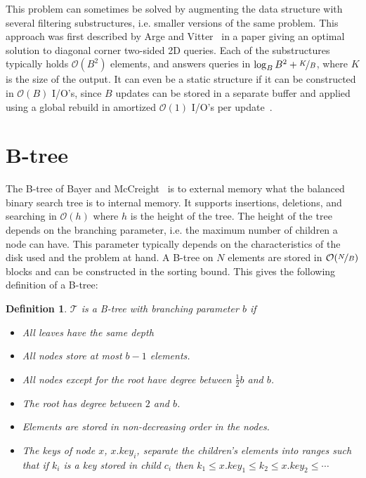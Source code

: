 \documentclass[twoside,11pt,openright]{report}
\newtheorem{definition}{Definition}
\begin{document}
This problem can sometimes be solved by augmenting the data structure with several filtering substructures, i.e. smaller versions of the same problem. This approach was first described by Arge and Vitter~\cite{arge_vitter_2003} in a paper giving an optimal solution to diagonal corner two-sided 2D queries. Each of the substructures typically holds $\mathcal{O}(B^2)$ elements, and answers queries in $\log_B B^2 + \nicefrac{K}{B}$, where $K$ is the size of the output. It can even be a static structure if it can be constructed in $\mathcal{O}(B)$ I/O's, since $B$ updates can be stored in a separate buffer and applied using a global rebuild in amortized $\mathcal{O}(1)$ I/O's per update~\cite{vitter_2008}.

\section{B-tree}
\label{sec:prelim_b_tree}
The B-tree of Bayer and McCreight~\cite{bayer_mccreight_1972} is to external memory what the balanced binary search tree is to internal memory. It supports insertions, deletions, and searching in $\mathcal{O}(h)$ where $h$ is the height of the tree. The height of the tree depends on the branching parameter, i.e. the maximum number of children a node can have. This parameter typically depends on the characteristics of the disk used and the problem at hand. A B-tree on $N$ elements are stored in $\mathcal{O}(\nicefrac{N}{B})$ blocks and can be constructed in the sorting bound.
This gives the following definition of a B-tree:

\begin{definition}
\label{def:btree}
$\mathcal{T}$ is a B-tree with branching parameter $b$ if
\begin{itemize}
	\item All leaves have the same depth
	\item All nodes store at most $b-1$ elements.
	\item All nodes except for the root have degree between $\frac{1}{2}b$ and $b$.
	\item The root has degree between $2$ and $b$.
	\item Elements are stored in non-decreasing order in the nodes.
	\item The keys of node $x$, $x.key_i$, separate the children's elements into ranges such that if $k_i$ is a key stored in child $c_i$ then $k_1 \leq x.key_1 \leq k_2 \leq x.key_2 \leq \cdots$
\end{itemize}
\end{definition}
\end{document}
